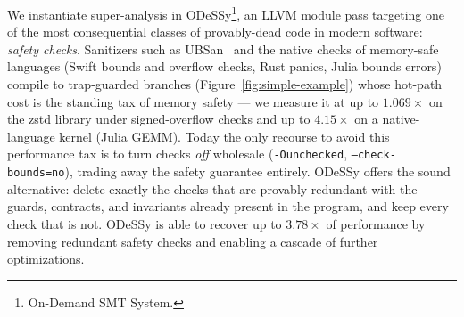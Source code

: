 \documentclass[acmsmall,screen,nonacm]{acmart}
\newcommand{\odessy}{ODeSSy}
\newcommand{\tool}{\odessy}
\begin{document}
We instantiate super-analysis in \tool{}\footnote{On-Demand SMT System.},
an LLVM module pass targeting one of the most consequential classes of
provably-dead code in modern software: \emph{safety checks}. Sanitizers
such as UBSan~\cite{ubsanDocs} and the native checks of memory-safe
languages (Swift bounds and overflow checks, Rust panics, Julia bounds
errors) compile to trap-guarded branches
(Figure~\ref{fig:simple-example}) whose hot-path cost is the
standing tax of memory safety --- we measure it at up to $1.069\times$ on
the zstd library under signed-overflow checks and up to $4.15\times$ on a native-language kernel (Julia GEMM).
Today the only recourse to avoid this performance tax is to turn checks \emph{off}
wholesale (\texttt{-Ounchecked}, \texttt{--check-bounds=no}), trading away
the safety guarantee entirely. \tool{} offers the sound alternative:
delete exactly the checks that are provably redundant with the guards,
contracts, and invariants already present in the program, and keep every
check that is not.
\tool{} is able to recover up to $3.78\times$ of performance by removing redundant safety checks and enabling a cascade of further optimizations.
\end{document}
